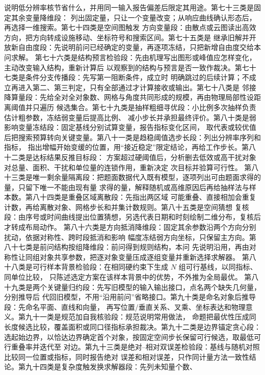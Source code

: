 \documentclass[UTF8,a4paper,12pt]{ctexart}
\begin{document}
说明低分辨率核节省什么，并用同一输入报告偏差后限定其用途。第七十三类是固定其余变量降维段：
列出固定量，只让一个变量改变；从响应曲线确认形态后，再选择一维搜索。第七十四类是空间图触发
方向变量段：由散点或云图读出高效方向，把方向转成设施移动、坐标符号和搜索区间。第七十五类是
继承旧解并开放新自由度段：先说明前问已经确定的变量，再逐项冻结，只把新增自由度交给本问求解。
第七十六类是结构预言检验段：先由机理写出图形或峰值应怎样变化，主动改变输入结构，重新计算后
以观察到的结构与预言是否一致作裁决。第七十七类是条件分支传播段：先写第一阻断条件，成立时
明确跳过的后续计算；不成立再进入第二、第三判定，只有全部通过才计算接收或输出。第七十八类是
邻接降算量段：先给全对全对象数、网格与角度共同形成的规模，再由物理局部性设距离阈值并只遍历
候选集合。第七十九类是抽样粗细寻优段：小比例多次抽样负责估计粗参数，冻结弱变量后提高比例、
减小步长并承担最终评价。第八十类是弱影响变量冻结段：固定基线分别试算变量，报告指标变化区间，
取代表或较优值后把搜索预算转向关键变量。第八十一类是趋稳阈值选步长段：列出分辨率序列和指标，
指出增幅开始变缓的位置，用“接近稳定”限定结论，再给工作步长。第八十二类是达标结果反推目标段：
方案超过硬阈值后，分析删去低效或高干扰对象对总量、面积、干扰和单位量的连锁作用，重新决定
次目标并验算可行性。
第八十三类是唯一剩余量隔离段：把题面数据代入既有模型，逐项列出可由题面求得的量，只留下唯一不能由现有量
求得的量，解释随机或高维原因后再给抽样法与样本数。第八十四类是重叠区域离散段：先指出两区域
可能重叠、直接相加会重复计数，再给离散对象、网格步长和并集计数规则。第八十五类是空间猜想
复核段：由序号或时间曲线提出位置猜想，另选代表日期和时刻绘制二维分布，复核后才转成布局动作。
第八十六类是方向抵消降维段：固定其余参数沿两个方向分别扰动，依据对称性、跨时段抵消和影响
幅度冻结弱方向坐标，只保留主方向。第八十七类是前问结构按组降维段：前问得到规则结构，本问
先说明沿用，再由对称性让同组对象共享参数，把逐对象变量压成逐组变量并重新选择求解器。
第八十八类是可行样本背景检验段：在相同硬约束下生成 $N$ 组可行基线，以同指标、同单位比较，
只陈述选定方案在该样本背景中的优势，不外推为全局最优。
第八十九类是两个关键量归约段：先写旧模型的输入输出接口，点名两个缺失几何量，分别推导后
代回旧模型，不用“沿用前问”省略接口。第九十类是命名对象后推导段：先命名平面、直线和向量，
再写位置/垂直关系、叉乘、坐标表达和物理意义。第九十一类是规范加自我核验段：规范说明常用做法，
命题把最优性压成同长度候选比较，覆盖面积或同口径指标承担裁决。第九十二类是边界锚定贪心段：
选起始边界，以恰达边界确定首个对象，按固定空间步长保留可行候选，取最低可行重叠率并迭代至
对边。第九十三类是绝对--相对双误差检验段：基线与随机对照比较同一位置或指标，同时报告绝对
误差和相对误差，只作同计量方法一致性结论。第九十四类是复杂度触发换求解器段：先列未知量个数、
\end{document}
